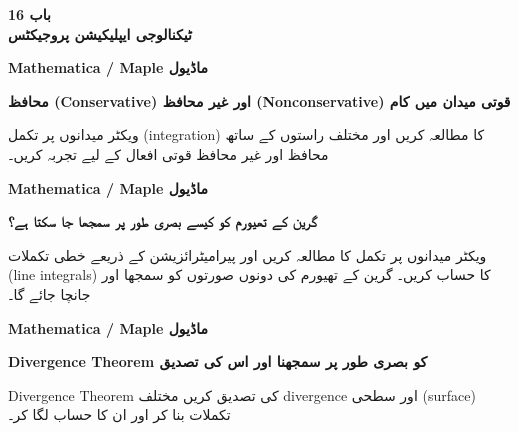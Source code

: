 





\begin{center}
\textbf{باب 16\\ ٹیکنالوجی ایپلیکیشن پروجیکٹس}
\end{center}

\vspace{0.5cm}

\textbf{Mathematica / Maple ماڈیول}

\textbf{محافظ (Conservative) اور غیر محافظ (Nonconservative) قوتی میدان میں کام}

ویکٹر میدانوں پر تکمل (integration) کا مطالعہ کریں اور مختلف راستوں کے ساتھ محافظ اور غیر محافظ قوتی افعال کے لیے تجربہ کریں۔

\vspace{0.4cm}

\textbf{Mathematica / Maple ماڈیول}

\textbf{گرین کے تھیورم کو کیسے بصری طور پر سمجھا جا سکتا ہے؟}

ویکٹر میدانوں پر تکمل کا مطالعہ کریں اور پیرامیٹرائزیشن کے ذریعے خطی تکملات (line integrals) کا حساب کریں۔ گرین کے تھیورم کی دونوں صورتوں کو سمجھا اور جانچا جائے گا۔

\vspace{0.4cm}

\textbf{Mathematica / Maple ماڈیول}

\textbf{Divergence Theorem کو بصری طور پر سمجھنا اور اس کی تصدیق}

Divergence Theorem کی تصدیق کریں مختلف divergence اور سطحی (surface) تکملات بنا کر اور ان کا حساب لگا کر۔





